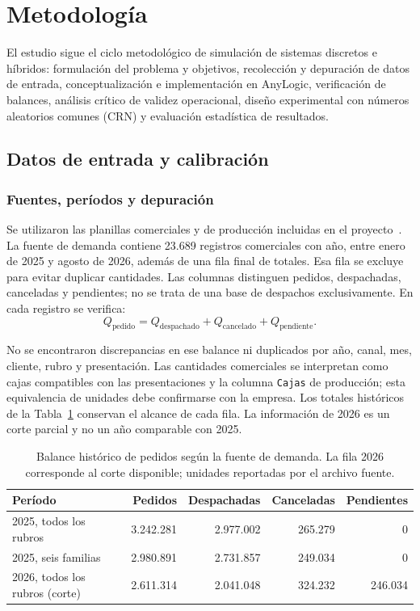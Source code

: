 \documentclass[11pt, a4paper]{article}
\begin{document}
\section{Metodología}
El estudio sigue el ciclo metodológico de simulación de sistemas discretos e híbridos: formulación del problema y objetivos, recolección y depuración de datos de entrada, conceptualización e implementación en AnyLogic, verificación de balances, análisis crítico de validez operacional, diseño experimental con números aleatorios comunes (CRN) y evaluación estadística de resultados.

\subsection{Datos de entrada y calibración}
\subsubsection{Fuentes, períodos y depuración}
Se utilizaron las planillas comerciales y de producción incluidas en el proyecto~\cite{datos-demanda,datos-produccion}. La fuente de demanda contiene 23.689 registros comerciales con año, entre enero de 2025 y agosto de 2026, además de una fila final de totales. Esa fila se excluye para evitar duplicar cantidades. Las columnas distinguen pedidos, despachadas, canceladas y pendientes; no se trata de una base de despachos exclusivamente. En cada registro se verifica:
\begin{equation}
    Q_{\text{pedido}}=Q_{\text{despachado}}+Q_{\text{cancelado}}+Q_{\text{pendiente}}.
\end{equation}

No se encontraron discrepancias en ese balance ni duplicados por año, canal, mes, cliente, rubro y presentación. Las cantidades comerciales se interpretan como cajas compatibles con las presentaciones y la columna \texttt{Cajas} de producción; esta equivalencia de unidades debe confirmarse con la empresa. Los totales históricos de la Tabla~\ref{tab:balance_historico} conservan el alcance de cada fila. La información de 2026 es un corte parcial y no un año comparable con 2025.

\begin{table}[htbp]
\centering
\caption{Balance histórico de pedidos según la fuente de demanda. La fila 2026 corresponde al corte disponible; unidades reportadas por el archivo fuente.}
\label{tab:balance_historico}
\small
\begin{tabularx}{\textwidth}{Xrrrr}
\toprule
Período & Pedidos & Despachadas & Canceladas & Pendientes \\
\midrule
2025, todos los rubros & 3.242.281 & 2.977.002 & 265.279 & 0 \\
2025, seis familias & 2.980.891 & 2.731.857 & 249.034 & 0 \\
2026, todos los rubros (corte) & 2.611.314 & 2.041.048 & 324.232 & 246.034 \\
\bottomrule
\end{tabularx}
\end{table}
\end{document}
